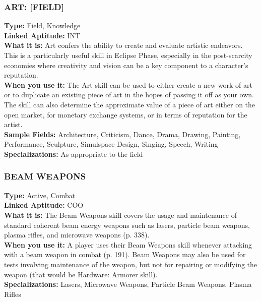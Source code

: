 \subsubsection{ART: [FIELD]} \textbf{Type:} Field, Knowledge \\ \textbf{Linked Aptitude:} INT \\ \textbf{What it is:} Art confers the ability to create and evaluate artistic endeavors. This is a particularly useful skill in Eclipse Phase, especially in the post-scarcity economies where creativity and vision can be a key component to a character’s reputation. \\ \textbf{When you use it:} The Art skill can be used to either create a new work of art or to duplicate an existing piece of art in the hopes of passing it off as your own. The skill can also determine the approximate value of a piece of art either on the open market, for monetary exchange systems, or in terms of reputation for the artist. \\ \textbf{Sample Fields:} Architecture, Criticism, Dance, Drama, Drawing, Painting, Performance, Sculpture, Simulspace Design, Singing, Speech, Writing \\ \textbf{Specializations:} As appropriate to the field 

\subsubsection{BEAM WEAPONS} \textbf{Type:} Active, Combat \\ \textbf{Linked Aptitude:} COO \\ \textbf{What it is:} The Beam Weapons skill covers the usage and maintenance of standard coherent beam energy weapons such as lasers, particle beam weapons, plasma rifles, and microwave weapons (p. 338). \\ \textbf{When you use it:} A player uses their Beam Weapons skill whenever attacking with a beam weapon in combat (p. 191). Beam Weapons may also be used for tests involving maintenance of the weapon, but not for repairing or modifying the weapon (that would be Hardware: Armorer skill). \\ \textbf{Specializations:} Lasers, Microwave Weapons, Particle Beam Weapons, Plasma Rifles 

